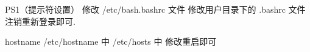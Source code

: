 PS1（提示符设置）
修改 /etc/bash.bashrc 文件
修改用户目录下的 .bashrc 文件
注销重新登录即可.

hostname
/etc/hostname 中
/etc/hosts 中
修改重启即可